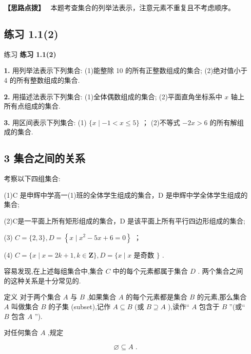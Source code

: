 \documentclass[a4paper,10pt,oneside,fontset=none]{ctexbook}
\renewcommand{\leq}{\leqslant}
\newenvironment{exercise}[1][]{\begin{exBox}{练习}{#1}}{\end{exBox}}
\numberwithin{equation}{chapter}
\newenvironment{hint}{\begin{hintBox}\textbf{【思路点拨】}~}{\end{hintBox}}
\begin{document}
\begin{hint}
本题考查集合的列举法表示，注意元素不重复且不考虑顺序。
\end{hint}

\subsection*{练习 1.1(2)}

\begin{exercise}
\textbf{练习 1.1(2)}\par\vspace{0.5em}
\textbf{1.} 用列举法表示下列集合: (1)能整除 10 的所有正整数组成的集合; (2)绝对值小于 4 的所有整数组成的集合.
\par\vspace{0.8em}
\textbf{2.} 用描述法表示下列集合: (1)全体偶数组成的集合; (2)平面直角坐标系中 $x$ 轴上所有点组成的集合.
\par\vspace{0.8em}
\textbf{3.} 用区间表示下列集合: (1) $\{ x \mid   - 1 < x \leq  5\}$ ； (2)不等式 $- {2x} > 6$ 的所有解组成的集合.
\end{exercise}

\subsection{3 集合之间的关系}

考察以下四组集合:

(1)C 是申辉中学高一(1)班的全体学生组成的集合，D 是申辉中学全体学生组成的集合;

(2)C是一平面上所有矩形组成的集合，D 是该平面上所有平行四边形组成的集合;

(3) $C = \{ 2,3\} , D = \left\{  {x \mid  {x}^{2} - {5x} + 6 = 0}\right\}$ ；

(4) $C = \{ x \mid  x = {2k} + 1, k \in  \mathbf{Z}\} , D = \{ x \mid  x$ 是奇数 $\}$ .

容易发现,在上述每组集合中,集合 $C$ 中的每个元素都属于集合 $D$ . 两个集合之间的这种关系是十分常见的.

定义 对于两个集合 $A$ 与 $B$ ,如果集合 $A$ 的每个元素都是集合 $B$ 的元素,那么集合 $A$ 叫做集合 $B$ 的子集 (subset),记作 $A \subseteq  B$ (或 $B \supseteq  A$ ),读作“ $A$ 包含于 $B$ ”(或“ $B$ 包含 $A$ ”).

对任何集合 $A$ ,规定

$$

\varnothing  \subseteq  A\text{ . }

$$
\end{document}
